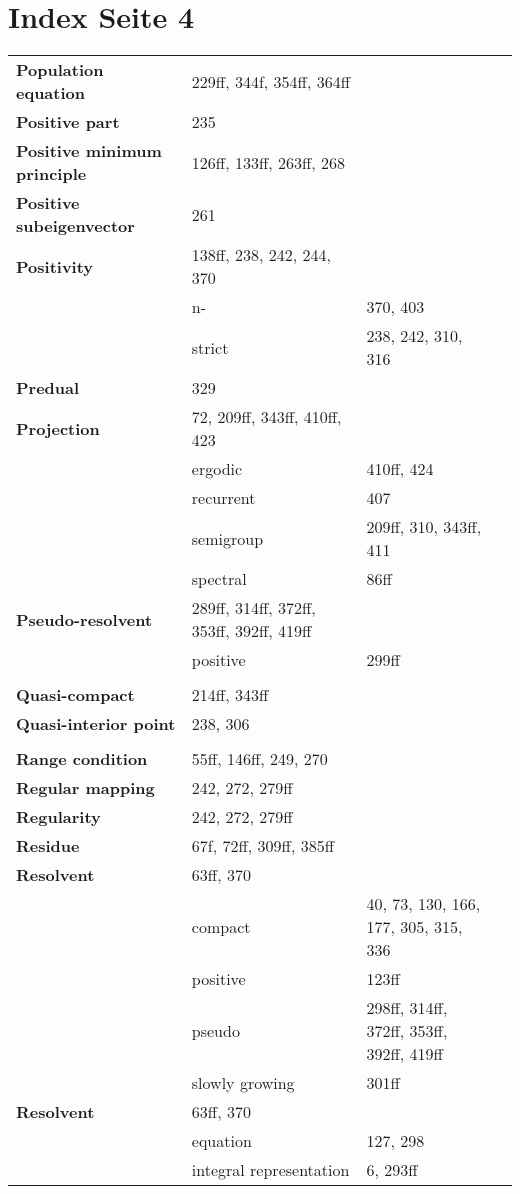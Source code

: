 \documentclass[10pt]{scrartcl}
\begin{document}
\pagestyle{empty}
\section*{Index Seite 4 }
\begin{longtable}{>{\bfseries}p{4cm}p{4cm}p{4cm}p{4cm}}

Population equation 	& 229ff, 344f, 354ff, 364ff \\
Positive part 	& 235 \\
Positive minimum principle 	& 126ff, 133ff, 263ff, 268 \\
Positive subeigenvector 	& 261 \\
Positivity 	& 138ff, 238, 242, 244, 370 \\
	& n- 	& 370, 403 \\
	& strict 	& 238, 242, 310, 316 \\
Predual 	& 329 \\
Projection 	& 72, 209ff, 343ff, 410ff, 423 \\
	& ergodic 	& 410ff, 424 \\
	& recurrent 	& 407 \\
	& semigroup 	& 209ff, 310, 343ff, 411 \\
	& spectral 	& 86ff \\
Pseudo-resolvent 	& 289ff, 314ff, 372ff, 353ff, 392ff, 419ff \\
	& positive 	& 299ff \\
	& \\
Quasi-compact 	& 214ff, 343ff \\
Quasi-interior point 	& 238, 306 \\
	& \\
Range condition 	& 55ff, 146ff, 249, 270 \\
Regular mapping 	& 242, 272, 279ff \\
Regularity 	& 242, 272, 279ff \\
Residue 	& 67f, 72ff, 309ff, 385ff \\
Resolvent 	& 63ff, 370 \\
	& compact 	& 40, 73, 130, 166, 177, 305, 315, 336 \\
	& positive 	& 123ff \\
	& pseudo 	& 298ff, 314ff, 372ff, 353ff, 392ff, 419ff \\
	& slowly growing 	& 301ff \\
Resolvent 	& 63ff, 370 \\
	& equation 	& 127, 298 \\
	& integral representation 	& 6, 293ff \\

\end{longtable}
\end{document}
